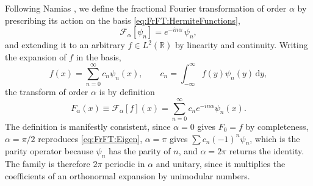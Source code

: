 			Following Namias \citeyearpar{namias1980fractional}, we define the fractional Fourier transformation of order $\alpha$ by prescribing its action on the basis \eqref{eq:FrFT:HermiteFunctions},
			\begin{equation}\label{eq:FrFT:SpectralDef}
				\mathcal{F}_{\alpha}\left[\psi_{n}\right] = e^{-in\alpha}\,\psi_{n},
			\end{equation}
			and extending it to an arbitrary $f\in L^{2}(\mathbb{R})$ by linearity and continuity. Writing the expansion of $f$ in the basis,
			\begin{equation}\label{eq:FrFT:Expansion}
				f(x) = \sum_{n=0}^{\infty}c_{n}\psi_{n}(x), \qquad c_{n} = \int_{-\infty}^{\infty}f(y)\psi_{n}(y)\,\mathrm{d}y,
			\end{equation}
			the transform of order $\alpha$ is by definition
			\begin{equation}\label{eq:FrFT:SpectralTransform}
				F_{\alpha}(x) \equiv \mathcal{F}_{\alpha}\left[f\right](x) = \sum_{n=0}^{\infty}c_{n}e^{-in\alpha}\psi_{n}(x).
			\end{equation}
			The definition is manifestly consistent, since $\alpha = 0$ gives $F_{0} = f$ by completeness, $\alpha = \pi/2$ reproduces \eqref{eq:FrFT:Eigen}, $\alpha = \pi$ gives $\sum c_{n}(-1)^{n}\psi_{n}$, which is the parity operator because $\psi_{n}$ has the parity of $n$, and $\alpha = 2\pi$ returns the identity. The family is therefore $2\pi$ periodic in $\alpha$ and unitary, since it multiplies the coefficients of an orthonormal expansion by unimodular numbers.

